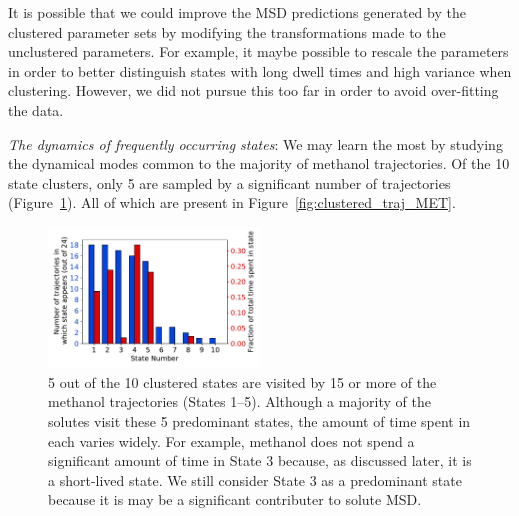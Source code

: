 \documentclass[journal=jpcbfk,manuscript=article]{achemso}
\begin{document}
  It is possible that we could improve the MSD predictions generated by the 
  clustered parameter sets by modifying the transformations made to the
  unclustered parameters. For example, it maybe possible to rescale the
  parameters in order to better distinguish states with long dwell times
  and high variance when clustering. However, we did not pursue this too 
  far in order to avoid over-fitting the data.

  \textit{The dynamics of frequently occurring states}: We may learn the most by 
  studying the dynamical modes common to the majority of methanol trajectories.
  Of the 10 state clusters, only 5 are sampled by a significant number of 
  trajectories (Figure~\ref{fig:prevalence}). All of which are present in 
  Figure~\ref{fig:clustered_traj_MET}.
  
  \begin{figure}
  \centering
  \includegraphics[width=0.5\textwidth]{prevalence.pdf}
  \caption{5 out of the 10 clustered states are visited by 15 or more of the methanol
  trajectories (States 1--5). Although a majority of the solutes visit these 5 
  predominant states, the amount of time spent in each varies widely. For example, methanol
  does not spend a significant amount of time in State 3 because, as discussed later, it 
  is a short-lived state. We still consider State 3 as a predominant state because it
  is may be a significant contributer to solute MSD.
  }
  \label{fig:prevalence}
  \end{figure}
  
\end{document}

